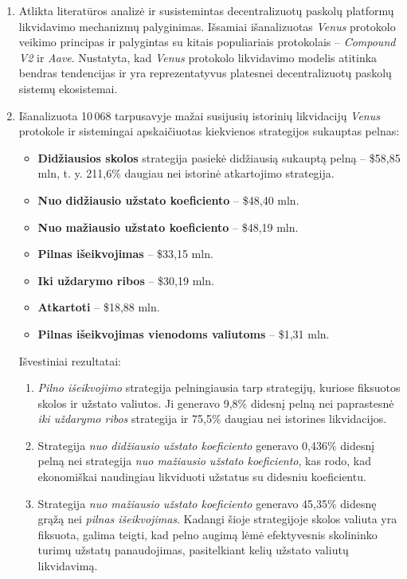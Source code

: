 \documentclass[]{VUMIFTemplateClass}
\begin{document}
\begin{enumerate}
\item Atlikta literatūros analizė ir susistemintas decentralizuotų paskolų platformų likvidavimo mechanizmų palyginimas. Išsamiai išanalizuotas \textit{Venus} protokolo veikimo principas ir palygintas su kitais populiariais protokolais – \textit{Compound V2} ir \textit{Aave}. Nustatyta, kad \textit{Venus} protokolo likvidavimo modelis atitinka bendras tendencijas ir yra reprezentatyvus platesnei decentralizuotų paskolų sistemų ekosistemai.

\item Išanalizuota 10\,068 tarpusavyje mažai susijusių istorinių likvidacijų \textit{Venus} protokole ir sistemingai apskaičiuotas kiekvienos strategijos sukauptas pelnas:
  \begin{itemize}
  \item \textbf{Didžiausios skolos} strategija pasiekė didžiausią sukauptą pelną – \$58,85 mln, t. y. 211,6\% daugiau nei istorinė atkartojimo strategija.
  \item \textbf{Nuo didžiausio užstato koeficiento} – \$48,40 mln.
  \item \textbf{Nuo mažiausio užstato koeficiento} – \$48,19 mln.
  \item \textbf{Pilnas išeikvojimas} – \$33,15 mln.
  \item \textbf{Iki uždarymo ribos} – \$30,19 mln.
  \item \textbf{Atkartoti} – \$18,88 mln.
  \item \textbf{Pilnas išeikvojimas vienodoms valiutoms} – \$1,31 mln.
  \end{itemize}
  Išvestiniai rezultatai:
  \begin{enumerate}
    \item \textit{Pilno išeikvojimo} strategija pelningiausia tarp strategijų, kuriose fiksuotos skolos ir užstato valiutos. Ji generavo 9,8\% didesnį pelną nei paprastesnė \textit{iki uždarymo ribos} strategija ir 75,5\% daugiau nei istorines likvidacijos.
    \item Strategija \textit{nuo didžiausio užstato koeficiento} generavo 0,436\% didesnį pelną nei strategija \textit{nuo mažiausio užstato koeficiento}, kas rodo, kad ekonomiškai naudingiau likviduoti užstatus su didesniu koeficientu.
    \item Strategija \textit{nuo mažiausio užstato koeficiento} generavo 45,35\% didesnę grąžą nei \textit{pilnas išeikvojimas}. Kadangi šioje strategijoje skolos valiuta yra fiksuota, galima teigti, kad pelno augimą lėmė efektyvesnis skolininko turimų užstatų panaudojimas, pasitelkiant kelių užstato valiutų likvidavimą.

\end{enumerate}
\end{enumerate}
\end{document}
